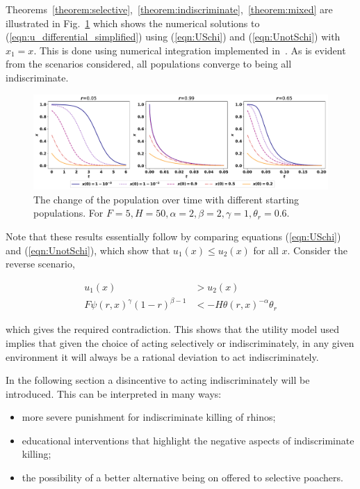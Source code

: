 \documentclass[10pt]{article}
\begin{document}
Theorems~\ref{theorem:selective},~\ref{theorem:indiscriminate},~\ref{theorem:mixed}
are illustrated in Fig.~\ref{fig:indiscriminate_ess}
which shows the numerical solutions to (\ref{eqn:u_differential_simplified})
using (\ref{eqn:USchi}) and  (\ref{eqn:UnotSchi}) with \(x_1=x\).
This is done using numerical integration implemented  in~\cite{scipy}.
As is evident from the scenarios considered, all populations converge 
to being all indiscriminate.

\begin{figure}[!htbp]
    \includegraphics[width=\textwidth]{images/IndiscriminateESS.pdf}
    \caption{\label{fig:indiscriminate_ess} The change of the population over
    time with different starting populations. For \(F=5, H=50,
    \alpha=2, \beta=2, \gamma=1, \theta_r=0.6\).}
\end{figure}

Note that these results essentially follow by comparing equations (\ref{eqn:USchi})
and (\ref{eqn:UnotSchi}), which show that \(u_1(x) \leq u_2(x)\) for all \(x\).
Consider the reverse scenario,

\begin{align}
    u_1(x) & > u_2(x)\\ 
    F\psi(r, x) ^ {\gamma} (1 - r) ^ {\beta - 1} & < -H \theta(r, x) ^ {-\alpha} \theta_r
\end{align}

which gives the required contradiction. This shows that the utility model used
implies that given the choice of acting selectively or indiscriminately, in any
given environment it will always be a rational deviation to act
indiscriminately.

In the following section a disincentive to acting indiscriminately will be
introduced. This can be interpreted in many ways:

\begin{itemize}
    \item more severe punishment for indiscriminate killing of rhinos;
    \item educational interventions that highlight the negative aspects of
        indiscriminate killing;
    \item the possibility of a better alternative being on offered to selective
        poachers.
\end{itemize}
\end{document}
